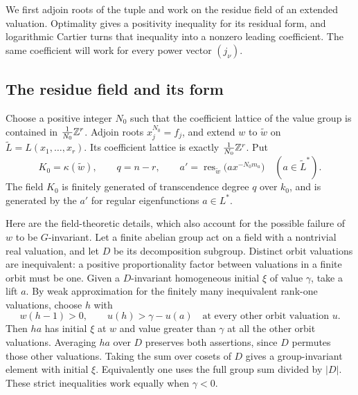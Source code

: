 We first adjoin roots of the tuple and work on the residue field of
an extended valuation. Optimality gives a positivity inequality for
its residual form, and logarithmic Cartier turns that inequality into
a nonzero leading coefficient.
The same coefficient will work for every power vector $(j_\nu)$.

\subsection{The residue field and its form}

Choose a positive integer $N_0$ such that the coefficient lattice of
the value group is contained in $\frac1{N_0}\mathbb Z^r$. Adjoin roots
$x_j^{N_0}=f_j$, and extend $w$ to $\widetilde w$ on
$\widetilde L=L(x_1,\ldots,x_r)$. Its coefficient lattice is exactly
$\frac1{N_0}\mathbb Z^r$. Put
\begin{equation}\label{car:normalized-initial}
 K_0=\kappa(\widetilde w),\qquad q=n-r,\qquad
 a'=\operatorname{res}_{\widetilde w}
       \bigl(a x^{-N_0m_a}\bigr)\quad(a\in\widetilde L^*).
\end{equation}
The field $K_0$ is finitely generated of transcendence degree $q$
over $k_0$, and is generated by the $a'$ for regular eigenfunctions
$a\in L^*$.

Here are the field-theoretic details, which also account for the
possible failure of $w$ to be $G$-invariant. Let a finite abelian
group act on a field with a nontrivial real valuation, and let $D$
be its decomposition subgroup. Distinct orbit valuations are
inequivalent: a positive proportionality factor between valuations
in a finite orbit must be one. Given a $D$-invariant homogeneous
initial $\xi$ of value $\gamma$, take a lift $a$. By weak
approximation for the finitely many inequivalent rank-one valuations,
choose $h$ with
\[
 w(h-1)>0,\qquad u(h)>\gamma-u(a)
 \quad\text{at every other orbit valuation }u.
\]
Then $ha$ has initial $\xi$ at $w$ and value greater than $\gamma$
at all the other orbit valuations. Averaging $ha$ over $D$ preserves
both assertions, since $D$ permutes those other valuations. Taking
the sum over cosets of $D$ gives a group-invariant element with
initial $\xi$. Equivalently one uses the full group sum divided by
$|D|$. These strict inequalities work equally when $\gamma<0$.

